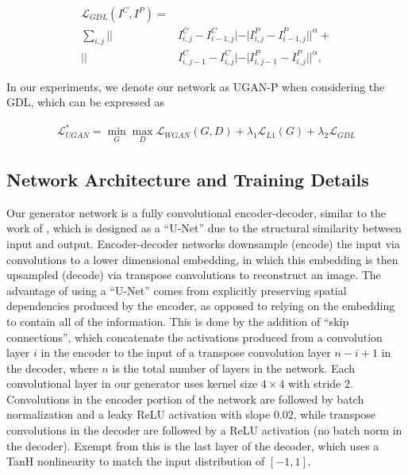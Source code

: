 \documentclass[conference,reqno]{IEEEtran}
\begin{document}
\begin{equation}
   \begin{aligned}
      \mathcal{L}_{GDL}(I^C, I^P) = \\ \sum\limits_{i,j} || & I^C_{i,j} - I^C_{i-1,j}| - | I^P_{i,j} - I^P_{i-1,j}||^{\alpha} + \\
      || & I^C_{i,j-1} - I^C_{i,j}| - | I^P_{i,j-1} - I^P_{i,j}||^{\alpha},
   \end{aligned}
\end{equation}

\noindent In our experiments, we denote our network as UGAN-P when considering the GDL, which can be expressed as

\begin{equation}
   \begin{aligned}
      \mathcal{L}_{UGAN}^* = \min\limits_{G}\max\limits_{D} \mathcal{L}_{WGAN}(G,D) + \lambda_{1} \mathcal{L}_{L1}(G) +  \lambda_{2} \mathcal{L}_{GDL}
   \end{aligned}
\end{equation}


\subsection{Network Architecture and Training Details}
Our generator network is a fully convolutional encoder-decoder, similar to the work of \cite{isola2016image}, which is
designed as a ``U-Net'' \cite{ronneberger2015u} due to the structural similarity between input and output.
Encoder-decoder networks downsample (encode) the input via convolutions to a lower dimensional embedding, in which
this embedding is then upsampled (decode) via transpose convolutions to reconstruct an image. The advantage of using
a ``U-Net'' comes from explicitly preserving spatial dependencies produced by the encoder, as opposed to relying on the
embedding to contain all of the information. This is done by the addition of ``skip connections'', which concatenate
the activations produced from a convolution layer $i$ in the encoder to the input of a transpose convolution layer
$n-i+1$ in the decoder, where $n$ is the total number of layers in the network. Each convolutional layer in our
generator uses kernel size $4 \times 4$ with stride 2. Convolutions in the encoder portion of the network are followed
by batch normalization \cite{pmlr-v37-ioffe15} and a leaky ReLU activation with slope $0.02$, while transpose
convolutions in the decoder are followed by a ReLU activation \cite{nair2010rectified} (no batch norm in the decoder).
Exempt from this is the last
layer of the decoder, which uses a TanH nonlinearity to match the input distribution of $[-1, 1]$. 
\end{document}
